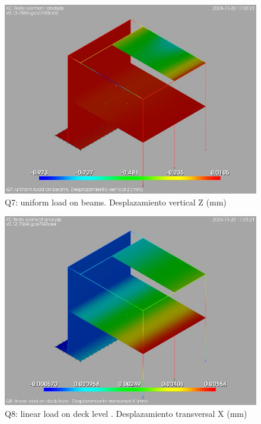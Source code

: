 \begin{figure}[ht]
\begin{center}
\includegraphics[width=\linewidth]{results/graphics/resSimplLC/qunifBeamsuZ.png}
\caption{Q7: uniform load on beams. Desplazamiento vertical Z (mm)}
\label{qunifBeamsuZ}
\end{center}
\end{figure}
\begin{figure}[ht]
\begin{center}
\includegraphics[width=\linewidth]{results/graphics/resSimplLC/qlinDeckuX.png}
\caption{Q8: linear load on deck level . Desplazamiento transversal X (mm)}
\label{qlinDeckuX}
\end{center}
\end{figure}

